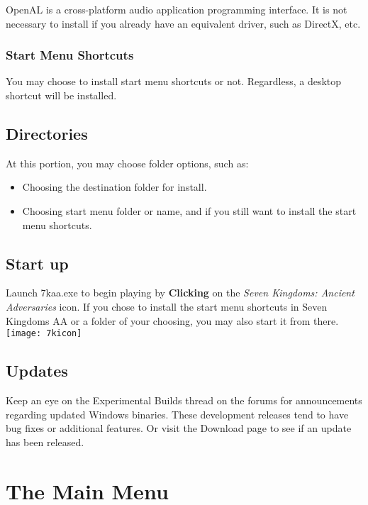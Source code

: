 OpenAL is a cross-platform audio application programming interface. It is not necessary to install if you already have an equivalent driver, such as DirectX, etc.

\subsubsection{Start Menu Shortcuts}

You may choose to install start menu shortcuts or not. Regardless, a desktop shortcut will be installed.  

\subsection{Directories}

At this portion, you may choose folder options, such as:

\begin{itemize}
	\item Choosing the destination folder for install.
	\item Choosing start menu folder or name, and if you still want to install the start menu shortcuts.
\end{itemize}

\subsection{Start up}

Launch 7kaa.exe to begin playing by \textbf{Clicking} on the \textit{Seven Kingdoms: Ancient Adversaries} icon. If you chose to install the start menu shortcuts in Seven Kingdoms AA or a folder of your choosing, you may also start it from there. \\ %

\texttt{[image: 7kicon]} %

\subsection{Updates}

Keep an eye on the Experimental Builds thread on the forums for announcements regarding updated Windows binaries. These development releases tend to have bug fixes or additional features. Or visit the Download page to see if an update has been released.

\section{The Main Menu}

